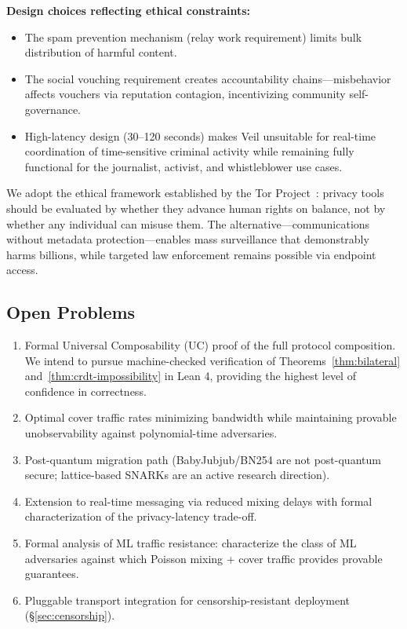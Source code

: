 \documentclass[11pt,a4paper]{article}
\begin{document}
\textbf{Design choices reflecting ethical constraints:}
\begin{itemize}[nosep]
    \item The spam prevention mechanism (relay work requirement) limits bulk distribution of harmful content.
    \item The social vouching requirement creates accountability chains---misbehavior affects vouchers via reputation contagion, incentivizing community self-governance.
    \item High-latency design (30--120 seconds) makes Veil unsuitable for real-time coordination of time-sensitive criminal activity while remaining fully functional for the journalist, activist, and whistleblower use cases.
\end{itemize}

We adopt the ethical framework established by the Tor Project~\cite{tor-ethics}: privacy tools should be evaluated by whether they advance human rights on balance, not by whether any individual can misuse them. The alternative---communications without metadata protection---enables mass surveillance that demonstrably harms billions, while targeted law enforcement remains possible via endpoint access.

\subsection{Open Problems}

\begin{enumerate}
    \item Formal Universal Composability (UC) proof of the full protocol composition. We intend to pursue machine-checked verification of Theorems~\ref{thm:bilateral} and~\ref{thm:crdt-impossibility} in Lean 4, providing the highest level of confidence in correctness.
    \item Optimal cover traffic rates minimizing bandwidth while maintaining provable unobservability against polynomial-time adversaries.
    \item Post-quantum migration path (BabyJubjub/BN254 are not post-quantum secure; lattice-based SNARKs are an active research direction).
    \item Extension to real-time messaging via reduced mixing delays with formal characterization of the privacy-latency trade-off.
    \item Formal analysis of ML traffic resistance: characterize the class of ML adversaries against which Poisson mixing + cover traffic provides provable guarantees.
    \item Pluggable transport integration for censorship-resistant deployment (\S\ref{sec:censorship}).
\end{enumerate}
\end{document}

